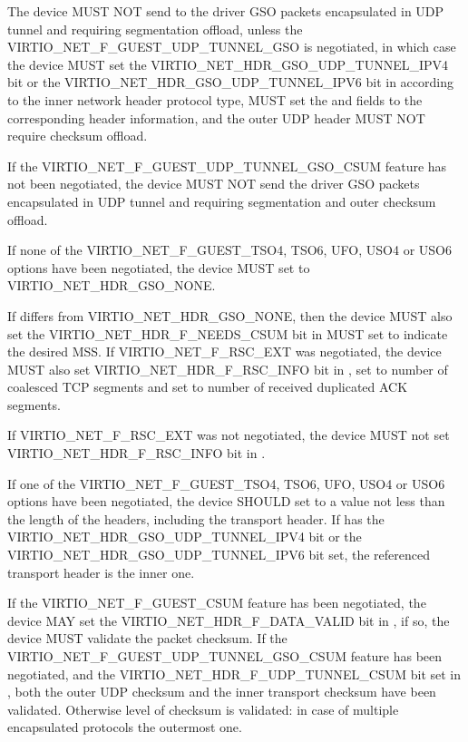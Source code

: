 The device MUST NOT send to the driver GSO packets encapsulated in UDP
tunnel and requiring segmentation offload, unless the
VIRTIO_NET_F_GUEST_UDP_TUNNEL_GSO is negotiated, in which case the device MUST set
the VIRTIO_NET_HDR_GSO_UDP_TUNNEL_IPV4 bit or the VIRTIO_NET_HDR_GSO_UDP_TUNNEL_IPV6
bit in  according to the inner network header protocol type,
MUST set the  and  fields
to the corresponding header information, and the outer UDP header MUST NOT
require checksum offload.

If the VIRTIO_NET_F_GUEST_UDP_TUNNEL_GSO_CSUM feature has not been negotiated,
the device MUST NOT send the driver GSO packets encapsulated in UDP
tunnel and requiring segmentation and outer checksum offload.

If none of the VIRTIO_NET_F_GUEST_TSO4, TSO6, UFO, USO4 or USO6 options have
been negotiated, the device MUST set  to
VIRTIO_NET_HDR_GSO_NONE.

If  differs from VIRTIO_NET_HDR_GSO_NONE, then
the device MUST also set the VIRTIO_NET_HDR_F_NEEDS_CSUM bit in
 MUST set  to indicate the desired MSS.
If VIRTIO_NET_F_RSC_EXT was negotiated, the device MUST also
set VIRTIO_NET_HDR_F_RSC_INFO bit in ,
set  to number of coalesced TCP segments and
set  to number of received duplicated ACK segments.

If VIRTIO_NET_F_RSC_EXT was not negotiated, the device MUST
not set VIRTIO_NET_HDR_F_RSC_INFO bit in .

If one of the VIRTIO_NET_F_GUEST_TSO4, TSO6, UFO, USO4 or USO6 options have
been negotiated, the device SHOULD set  to a value
not less than the length of the headers, including the transport
header. If  has the VIRTIO_NET_HDR_GSO_UDP_TUNNEL_IPV4 bit
or the VIRTIO_NET_HDR_GSO_UDP_TUNNEL_IPV6 bit set, the referenced transport
header is the inner one.

If the VIRTIO_NET_F_GUEST_CSUM feature has been negotiated, the
device MAY set the VIRTIO_NET_HDR_F_DATA_VALID bit in
, if so, the device MUST validate the packet
checksum. If the VIRTIO_NET_F_GUEST_UDP_TUNNEL_GSO_CSUM feature has
been negotiated, and the VIRTIO_NET_HDR_F_UDP_TUNNEL_CSUM bit set in
, both the outer UDP checksum and the inner transport
checksum have been validated.
Otherwise level of checksum is validated: in case of multiple
encapsulated protocols the outermost one.

